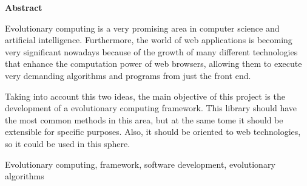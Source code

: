 \documentclass[spanish,a4paper,12pt,oneside]{extreport}
\newenvironment{summary}
{\par\noindent\begin{center}\textbf{Abstract}\end{center}\begin{itshape}\par\noindent}
{\end{itshape}}
\newenvironment{keywords}
{\begin{list}{}{\setlength{\leftmargin}{1em}}\item[\hskip\labelsep \bfseries Keywords:]}
{\end{list}}
\begin{document}
\newpage  %
\begin{summary}
{\em

Evolutionary computing is a very promising area in computer science and artificial intelligence. Furthermore, the world of web applications is becoming very significant nowadays because of the growth of many different technologies that enhance the computation power of web browsers, allowing them to execute very demanding algorithms and programs from just the front end.

Taking into account this two ideas, the main objective of this project is the development of a evolutionary computing framework. This library should have the most common methods in this area, but at the same tome it should be extensible for specific purposes. Also, it should be oriented to web technologies, so it could be used in this sphere.
}

\begin{keywords}
Evolutionary computing, framework, software development, evolutionary algorithms
\end{keywords}

\end{summary}

\newpage{\pagestyle{empty}}
\thispagestyle{empty}



\pagestyle{myheadings} %

\renewcommand{\thepage}{\roman{page}}
\setcounter{page}{1}


\tableofcontents

\newpage{\pagestyle{empty}}

\listoffigures
\end{document}
